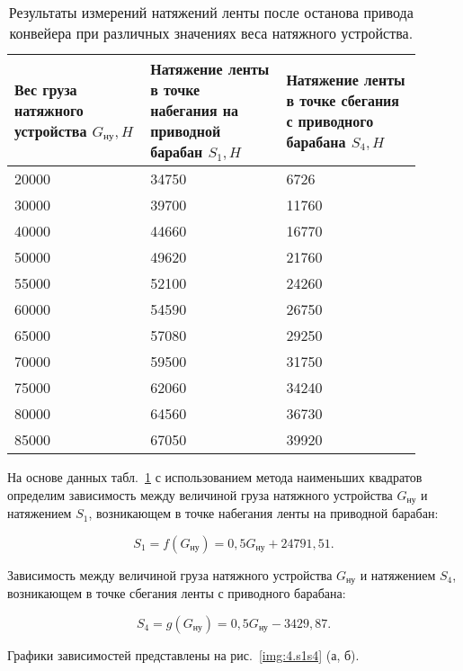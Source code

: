 \begin{table}[h!]
\caption{Результаты измерений натяжений ленты после останова привода конвейера при различных значениях веса натяжного устройства.}
\label{tabl:5.resultS}

\begin{center}
\begin{tabular}{|p{0.3\linewidth}|p{0.3\linewidth}|p{0.3\linewidth}|}
\hline
Вес груза натяжного устройства $ G_{\text{ну}}, H $ & Натяжение ленты в точке набегания на приводной барабан $ S_1, H $ & Натяжение ленты в точке сбегания с приводного барабана $ S_4, H $ \\
\hline
20000 & 34750 & 6726  \\
\hline
30000 & 39700 & 11760 \\
\hline
40000 & 44660 & 16770 \\
\hline
50000 & 49620 & 21760 \\
\hline
55000 & 52100 & 24260 \\
\hline
60000 & 54590 & 26750 \\
\hline
65000 & 57080 & 29250 \\
\hline
70000 & 59500 & 31750 \\
\hline
75000 & 62060 & 34240 \\
\hline
80000 & 64560 & 36730 \\
\hline
85000 & 67050 & 39920 \\
\hline
\end{tabular}
\end{center}
\end{table}

На основе данных табл.~\ref{tabl:5.resultS} с использованием метода наименьших квадратов определим зависимость между величиной груза натяжного устройства $ G_\text{ну} $ и натяжением $ S_1 $, возникающем в точке набегания ленты на приводной барабан:

\begin{equation}
\label{eq:4.s1g}
S_1 = f(G_\text{ну}) = 0,5 G_\text{ну} + 24791,51.
\end{equation}

Зависимость между величиной груза натяжного устройства $ G_\text{ну} $ и натяжением $ S_4 $, возникающем в точке сбегания ленты с приводного барабана:

\begin{equation}
\label{eq:4.s2g}
S_4 = g(G_\text{ну}) = 0,5 G_\text{ну} - 3429,87.
\end{equation}


Графики зависимостей представлены на рис.~\ref{img:4.s1s4} (а, б).

